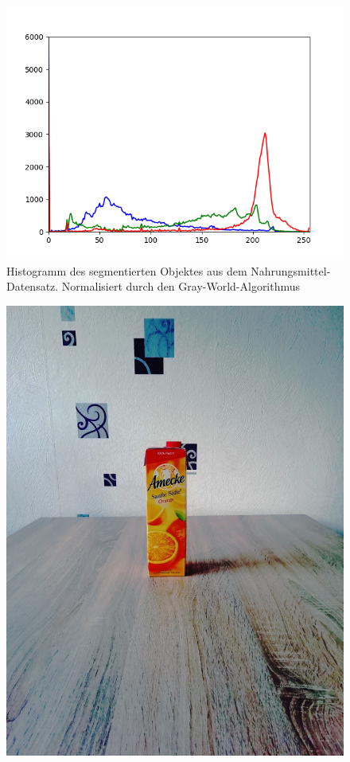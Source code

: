 \begin{appendices}
\begin{figure}[htb]
\begin{minipage}[c]{0.08\textwidth}
\end{minipage}
\hfill
\begin{minipage}[c]{0.3\textwidth}
\includegraphics[width=\textwidth]{Sources/Bild3_GW_histo.png}
\end{minipage}
\caption{Histogramm des segmentierten Objektes aus dem Nahrungsmittel-Datensatz. Normalisiert durch den Gray-World-Algorithmus}
\label{img:evalGW}
\end{figure}
\newpage
\begin{figure}[htb]
\begin{minipage}[c]{0.2\textwidth}
\includegraphics[width=\textwidth]{Sources/Bild1_HS.jpg}

\end{minipage}
\end{figure}
\end{appendices}
